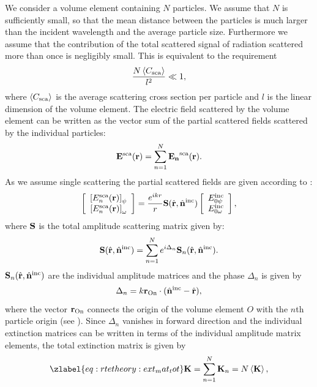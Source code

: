 We consider a volume element containing $N$ particles. We assume that
$N$ is sufficiently small, so that the mean distance between the
particles is much larger than the incident wavelength and the average
particle size. Furthermore we assume that the contribution of the
total scattered signal of radiation scattered more than once is
negligibly small.  This is equivalent to the requirement
\begin{equation}
  \frac{N\left\langle C_{\mathrm{sca}} \right\rangle}{l^2} \ll 1,
\end{equation}
where $\left\langle C_{\mathrm{sca}} \right\rangle$ is the average scattering cross section per
particle and $l$ is the linear dimension of the volume element.  The
electric field scattered by the volume element can be written as the
vector sum of the partial scattered fields scattered by the individual
particles:
\begin{equation}
  \mathbf{E}^{\mathrm{sca}}(\mathbf{r}) = \sum_{n=1}^{N}\mathbf{E_n}^{\mathrm{sca}}(\mathbf{r}).
\end{equation}
As we assume single scattering the partial scattered fields are given
according to :
\begin{equation}
  \ColVctTwo{\left[ E_n^{\sca}(\VctStl{r}) \right]_\ZntAng}%
         {\left[ E_n^{\sca}(\VctStl{r})\right]_\AzmAng}
         = \frac{e^{ikr}}{r}{\MtrStl{S}(\hat{\VctStl{r}},\hat{\VctStl{n}}^{\inc})} 
 \ColVctTwo{E_{0\ZntAng}^{\inc}}%
         {E_{0\AzmAng}^{\inc}},
\end{equation}
where $\mathbf{S}$ is the total amplitude scattering matrix given by:
\begin{equation}
  \mathbf{S}(\hat{\mathbf{r}},\hat{\mathbf{n}}^{\mathrm{inc}}) = \sum_{n=1}^N e^{i\Delta_n}  {\mathbf{S}_n(\hat{\mathbf{r}},\hat{\mathbf{n}}^{\mathrm{inc}})}.
\end{equation}
$\mathbf{S}_n(\hat{\mathbf{r}},\hat{\mathbf{n}}^{\mathrm{inc}})$ are the individual amplitude
matrices and the phase $\Delta_n$ is given by
\begin{equation}
  \Delta_n = k \mathbf{r}_\mathrm{On} \cdot(\hat{\mathbf{n}}^{\mathrm{inc}} - \hat{\mathbf{r}}),
\end{equation}
where the vector $\mathbf{r}_\mathrm{On}$ connects the origin of the volume
element $O$ with the $n$th particle origin (see
).  Since $\Delta_n$ vanishes in forward
direction and the individual extinction matrices can be written in
terms of the individual amplitude matrix elements, the total
extinction matrix is given by
\begin{equation}
  \zlabel{eq:rtetheory:ext_mat_tot}
  \ExtMat = \sum_{n=1}^N  \MtrStl{K}_n = N \EnsAvr{\ExtMat},
\end{equation}
